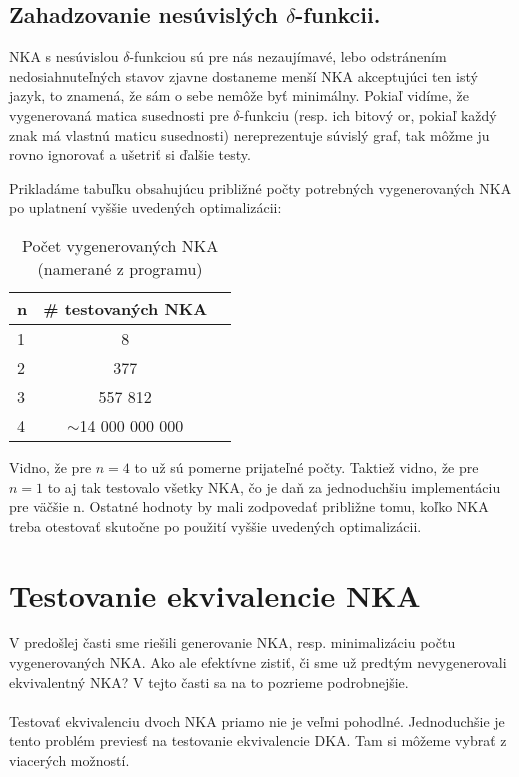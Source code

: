 \subsection{Zahadzovanie nesúvislých $\delta$-funkcii.} NKA s nesúvislou $\delta$-funkciou sú pre nás nezaujímavé, lebo odstránením nedosiahnuteľných stavov zjavne dostaneme menší NKA akceptujúci ten istý jazyk, to znamená, že sám o sebe nemôže byť minimálny. Pokiaľ vidíme, že vygenerovaná matica susednosti pre $\delta$-funkciu (resp. ich bitový or, pokiaľ každý znak má vlastnú maticu susednosti) nereprezentuje súvislý graf, tak môžme ju rovno ignorovať a ušetriť si ďalšie testy.   



Prikladáme tabuľku obsahujúcu približné počty potrebných vygenerovaných NKA po uplatnení vyššie uvedených optimalizácii:

\begin{table}[h]
  \centering
  \begin{tabular}{|l|c|r|}
    \hline
    n & \# testovaných NKA \\
    \hline
    1 & 8 \\ 
    \hline
    2 & 377 \\ 
    \hline
    3 & 557 812 \\
    \hline
    4 & $\sim$14 000 000 000 \\
    \hline
  \end{tabular}
  
  \caption{Počet vygenerovaných NKA (namerané z programu)}
  
  \label{tab:pocVsNKA}
\end{table}
Vidno, že pre $n=4$ to už sú pomerne prijateľné počty. Taktiež vidno, že pre $n=1$ to aj tak testovalo všetky NKA, čo je daň za jednoduchšiu implementáciu pre väčšie n. Ostatné hodnoty by mali zodpovedať približne tomu, koľko NKA treba otestovať skutočne po použití vyššie uvedených optimalizácii.

\section{Testovanie ekvivalencie NKA}
V predošlej časti sme riešili generovanie NKA, resp. minimalizáciu počtu vygenerovaných NKA. Ako ale efektívne zistiť, či sme už predtým nevygenerovali ekvivalentný NKA? V tejto časti sa na to pozrieme podrobnejšie.

\paragraph{}
Testovať ekvivalenciu dvoch NKA priamo nie je veľmi pohodlné. Jednoduchšie je tento problém previesť na testovanie ekvivalencie DKA. Tam si môžeme vybrať z viacerých možností.

